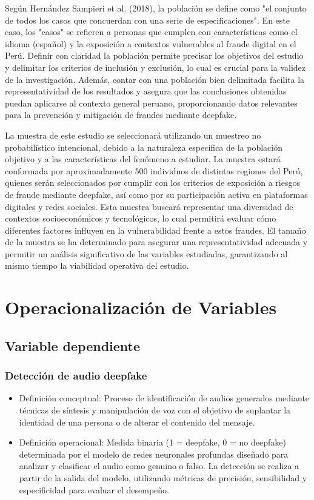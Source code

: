 Según Hernández Sampieri et al. (2018), la población se define como "el conjunto de todos los casos que concuerdan con una serie de especificaciones". En este caso, los "casos" se refieren a personas que cumplen con características como el idioma (español) y la exposición a contextos vulnerables al fraude digital en el Perú. Definir con claridad la población permite precisar los objetivos del estudio y delimitar los criterios de inclusión y exclusión, lo cual es crucial para la validez de la investigación. Además, contar con una población bien delimitada facilita la representatividad de los resultados y asegura que las conclusiones obtenidas puedan aplicarse al contexto general peruano, proporcionando datos relevantes para la prevención y mitigación de fraudes mediante deepfake.

La muestra de este estudio se seleccionará utilizando un muestreo no probabilístico intencional, debido a la naturaleza específica de la población objetivo y a las características del fenómeno a estudiar. La muestra estará conformada por aproximadamente 500 individuos de distintas regiones del Perú, quienes serán seleccionados por cumplir con los criterios de exposición a riesgos de fraude mediante deepfake, así como por su participación activa en plataformas digitales y redes sociales. Esta muestra buscará representar una diversidad de contextos socioeconómicos y tecnológicos, lo cual permitirá evaluar cómo diferentes factores influyen en la vulnerabilidad frente a estos fraudes. El tamaño de la muestra se ha determinado para asegurar una representatividad adecuada y permitir un análisis significativo de las variables estudiadas, garantizando al mismo tiempo la viabilidad operativa del estudio.


\section{Operacionalización de Variables}

\subsection{Variable dependiente}

\subsubsection{Detección de audio deepfake}

\begin{itemize}
	\item Definición conceptual: Proceso de identificación de audios generados mediante técnicas de síntesis y manipulación de voz con el objetivo de suplantar la identidad de una persona o de alterar el contenido del mensaje.
	\item Definición operacional: Medida binaria (1 = deepfake, 0 = no deepfake) determinada por el modelo de redes neuronales profundas diseñado para analizar y clasificar el audio como genuino o falso. La detección se realiza a partir de la salida del modelo, utilizando métricas de precisión, sensibilidad y especificidad para evaluar el desempeño.
\end{itemize}

